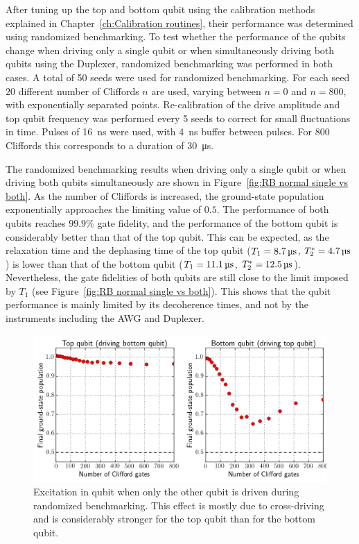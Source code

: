         After tuning up the top and bottom qubit using the calibration methods explained in Chapter~\ref{ch:Calibration routines}, their performance was determined using randomized benchmarking. To test whether the performance of the qubits change when driving only a single qubit or when simultaneously driving both qubits using the Duplexer, randomized benchmarking was performed in both cases. A total of 50 seeds were used for randomized benchmarking. For each seed $20$ different number of Cliffords $n$ are used, varying between $n=0$ and $n=800$, with exponentially separated points. Re-calibration of the drive amplitude and top qubit frequency was performed every 5 seeds to correct for small fluctuations in time. Pulses of \SI{16}{\nano \second} were used, with \SI{4}{\nano \second} buffer between pulses. For $800$ Cliffords this corresponds to a duration of \SI{30}{\micro \second}.

        The randomized benchmarking results when driving only a single qubit or when driving both qubits simultaneously are shown in Figure~\ref{fig:RB normal single vs both}. As the number of Cliffords is increased, the ground-state population exponentially approaches the limiting value of $0.5$. The performance of both qubits reaches $99.9\%$ gate fidelity, and the performance of the bottom qubit is considerably better than that of the top qubit.  This can be expected, as the relaxation time and the dephasing time of the top qubit ($T_1 = \text{\ensuremath{\SI{8.7}{\micro \second}}}$, $T_2^*=\text{\ensuremath{\SI{4.7}{\micro \second}}}$) is lower than that of the bottom qubit ($T_1 = \text{\ensuremath{\SI{11.1}{\micro \second}}}$, $T_2^*=\text{\ensuremath{\SI{12.5}{\micro \second}}}$). Nevertheless, the gate fidelities of both qubits are still close to the limit imposed by $T_1$ (see Figure~\ref{fig:RB normal single vs both}). This shows that the qubit performance is mainly limited by its decoherence times, and not by the instruments including the AWG and Duplexer.

        \begin{figure}[tb]
          \centering
          \includegraphics[width=\textwidth]{../Figures/Randomized benchmarking/RB_normal_cross-driving.png}
          \caption{Excitation in qubit when only the other qubit is driven during randomized benchmarking. This effect is mostly due to cross-driving and is considerably stronger for the top qubit than for the bottom qubit.}
          \label{fig:RB normal cross-driving}
        \end{figure}

